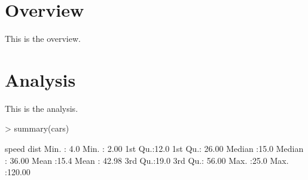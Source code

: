 \documentclass{article}
\begin{document}


\section{Overview}
This is the overview.


\section{Analysis}
This is the analysis.

\begin{Schunk}
\begin{Sinput}
> summary(cars)
\end{Sinput}
\begin{Soutput}
     speed           dist       
 Min.   : 4.0   Min.   :  2.00  
 1st Qu.:12.0   1st Qu.: 26.00  
 Median :15.0   Median : 36.00  
 Mean   :15.4   Mean   : 42.98  
 3rd Qu.:19.0   3rd Qu.: 56.00  
 Max.   :25.0   Max.   :120.00  
\end{Soutput}
\end{Schunk}
\end{document}
